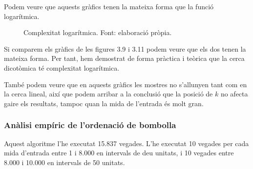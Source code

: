 \newpage
Podem veure que aquests gràfics tenen la mateixa forma que la funció logarítmica.

\begin{figure}[H]
    \centering
{}
    \caption[Complexitat logarítmica.]{Complexitat logarítmica. Font: elaboració pròpia.}
    \label{fig:my_label}
\end{figure}

Si comparem els gràfics de les figures 3.9 i 3.11 podem veure que els dos tenen la mateixa forma. Per tant, hem demostrat de forma pràctica i teòrica que la cerca dicotòmica té complexitat logarítmica.

També podem veure que en aquests gràfics les mostres no s'allunyen tant com en la cerca lineal, així que podem arribar a la conclusió que la posició de $k$ no afecta gaire els resultats, tampoc quan la mida de l'entrada és molt gran.

\subsubsection{Anàlisi empíric de l'ordenació de bombolla}
Aquest algoritme l'he executat 15.837 vegades. L'he executat 10 vegades per cada mida d'entrada entre 1 i 8.000 en intervals de deu unitats, i 10 vegades entre 8.000 i 10.000 en intervals de 50 unitats.

